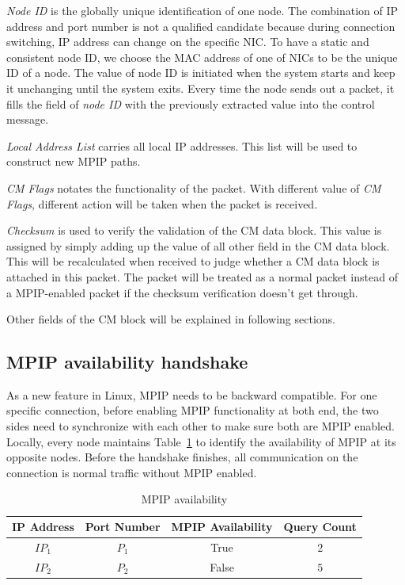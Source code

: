 \emph{Node ID} is the globally unique identification of one node. The combination of IP address and port number is not a qualified candidate because during connection switching, IP address can change on the specific NIC. To have a static and consistent node ID, we choose the MAC address of one of NICs to be the unique ID of a node. 
The value of node ID is initiated when the system starts and keep it unchanging until the system exits. Every time the node sends out a packet, it fills the field of \emph{node ID} with the previously extracted value into the control message.

\emph{Local Address List} carries all local IP addresses. This list will be used to construct new MPIP paths.

\emph{CM Flags} notates the functionality of the packet. With different value of \emph{CM Flags}, different action will be taken when the packet is received. 

\emph{Checksum} is used to verify the validation of the CM data block. This value is assigned by simply adding up the value of all other field in the CM data block. This will be recalculated when received to judge whether a CM data block is attached in this packet. The packet will be treated as a normal packet instead of a MPIP-enabled packet if the checksum verification doesn't get through.

Other fields of the CM block will be explained in following sections.

\subsection{MPIP availability handshake}

As a new feature in Linux, MPIP needs to be backward compatible. For one specific connection, before enabling MPIP functionality at both end, the two sides need to synchronize with each other to make sure both are MPIP enabled. Locally, every node maintains Table~\ref{tb.me} to identify the availability of MPIP at its opposite nodes. Before the handshake finishes, all communication on the connection is normal traffic without MPIP enabled.

\begin{table}[htbp]
\caption{\label{tb.me}MPIP availability}
\centering
\begin{tabular}{|c|c|c|c|}
\hline
IP Address & Port Number & MPIP Availability & Query Count\\
\hline
${IP}_{1}$ & ${P}_{1}$ & True  & $2$ \\
\hline
${IP}_{2}$ & ${P}_{2}$ & False & $5$ \\
\hline
\end{tabular}
\end{table}


